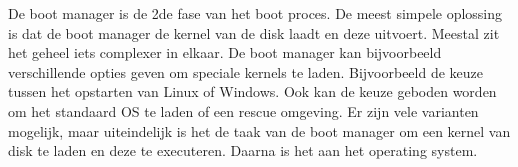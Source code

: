 De boot manager is de 2de fase van het boot proces. De meest simpele oplossing is dat de boot manager de kernel van de disk laadt en deze uitvoert. Meestal zit het geheel iets complexer in elkaar. De boot manager kan bijvoorbeeld verschillende opties geven om speciale kernels te laden. Bijvoorbeeld de keuze tussen het opstarten van Linux of Windows. Ook kan de keuze geboden worden om het standaard OS te laden of een rescue omgeving. Er zijn vele varianten mogelijk, maar uiteindelijk is het de taak van de boot manager om een kernel van disk te laden en deze te executeren. Daarna is het aan het operating system.

